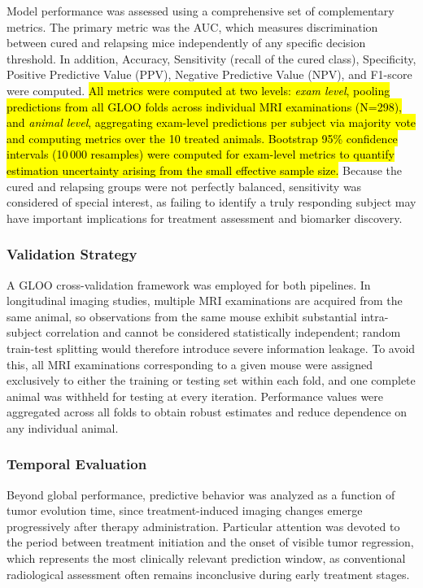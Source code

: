 \documentclass{article}
\begin{document}
Model performance was assessed using a comprehensive set of complementary metrics. The primary metric was the AUC, which measures discrimination between cured and relapsing mice independently of any specific decision threshold. In addition, Accuracy, Sensitivity (recall of the cured class), Specificity, Positive Predictive Value (PPV), Negative Predictive Value (NPV), and F1-score were computed. \hl{All metrics were computed at two levels: \textit{exam level}, pooling predictions from all GLOO folds across individual MRI examinations (N=298), and \textit{animal level}, aggregating exam-level predictions per subject via majority vote and computing metrics over the 10 treated animals. Bootstrap 95\% confidence intervals (10\,000 resamples) were computed for exam-level metrics to quantify estimation uncertainty arising from the small effective sample size.} Because the cured and relapsing groups were not perfectly balanced, sensitivity was considered of special interest, as failing to identify a truly responding subject may have important implications for treatment assessment and biomarker discovery.

\subsubsection{Validation Strategy}

A GLOO cross-validation framework was employed for both pipelines. In longitudinal imaging studies, multiple MRI examinations are acquired from the same animal, so observations from the same mouse exhibit substantial intra-subject correlation and cannot be considered statistically independent; random train-test splitting would therefore introduce severe information leakage. To avoid this, all MRI examinations corresponding to a given mouse were assigned exclusively to either the training or testing set within each fold, and one complete animal was withheld for testing at every iteration. Performance values were aggregated across all folds to obtain robust estimates and reduce dependence on any individual animal.

\subsubsection{Temporal Evaluation}

Beyond global performance, predictive behavior was analyzed as a function of tumor evolution time, since treatment-induced imaging changes emerge progressively after therapy administration. Particular attention was devoted to the period between treatment initiation and the onset of visible tumor regression, which represents the most clinically relevant prediction window, as conventional radiological assessment often remains inconclusive during early treatment stages.
\end{document}
